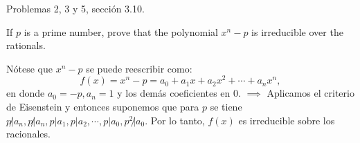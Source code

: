 




Problemas 2, 3 y 5, sección 3.10.


\begin{problema}[Problema 2]
    If $p$ is a prime number, prove that the polynomial $x^n-p$ is irreducible over the rationals.
    \begin{dem}
        Nótese que $x^n-p$ se puede reescribir como: 
        $$f(x)=x^n -p = a_0+a_1x+a_2x^2 +\cdots + a_nx^n,$$
        en donde $a_0=-p, a_n=1$ y los demás coeficientes en 0. $\implies$ Aplicamos el criterio de Eisenstein  y entonces suponemos que para $p$ se tiene $p\not|a_n, p\not| a_n, p|a_1,p|a_2,\cdots, p|a_0, p^2\not| a_0$. Por lo tanto, $f(x)$ es irreducible sobre los racionales.
    \end{dem}
\end{problema}


